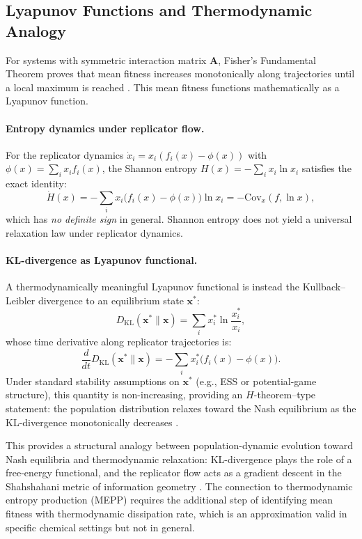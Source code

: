 \documentclass[12pt,a4paper]{article}
\theoremstyle{remark}
\begin{document}
\subsection{Lyapunov Functions and Thermodynamic Analogy}

For systems with symmetric interaction matrix $\mathbf{A}$, Fisher's Fundamental Theorem proves that mean fitness increases monotonically along trajectories until a local maximum is reached \citep{ReplicatorEntropy}. This mean fitness functions mathematically as a Lyapunov function.

\paragraph{Entropy dynamics under replicator flow.}
For the replicator dynamics $\dot{x}_i = x_i(f_i(x) - \phi(x))$ with $\phi(x) = \sum_i x_i f_i(x)$, the Shannon entropy $H(x) = -\sum_i x_i \ln x_i$ satisfies the exact identity:
\begin{equation}
\dot{H}(x) = -\sum_i x_i \big(f_i(x) - \phi(x)\big) \ln x_i = -\mathrm{Cov}_x(f, \ln x),
\end{equation}
which has \emph{no definite sign} in general. Shannon entropy does not yield a universal relaxation law under replicator dynamics.

\paragraph{KL-divergence as Lyapunov functional.}
A thermodynamically meaningful Lyapunov functional is instead the Kullback--Leibler divergence to an equilibrium state $\mathbf{x}^*$:
\begin{equation}
D_{\mathrm{KL}}(\mathbf{x}^* \| \mathbf{x}) = \sum_i x_i^* \ln \frac{x_i^*}{x_i},
\end{equation}
whose time derivative along replicator trajectories is:
\begin{equation}
\frac{d}{dt} D_{\mathrm{KL}}(\mathbf{x}^* \| \mathbf{x}) = -\sum_i x_i^* \big(f_i(x) - \phi(x)\big).
\end{equation}
Under standard stability assumptions on $\mathbf{x}^*$ (e.g., ESS or potential-game structure), this quantity is non-increasing, providing an $H$-theorem--type statement: the population distribution relaxes toward the Nash equilibrium as the KL-divergence monotonically decreases \citep{HofbauerSigmund1998,ReplicatorEntropy}.

This provides a structural analogy between population-dynamic evolution toward Nash equilibria and thermodynamic relaxation: KL-divergence plays the role of a free-energy functional, and the replicator flow acts as a gradient descent in the Shahshahani metric of information geometry \citep{ReplicatorEntropy}. The connection to thermodynamic entropy production (MEPP) requires the additional step of identifying mean fitness with thermodynamic dissipation rate, which is an approximation valid in specific chemical settings but not in general.
\end{document}
